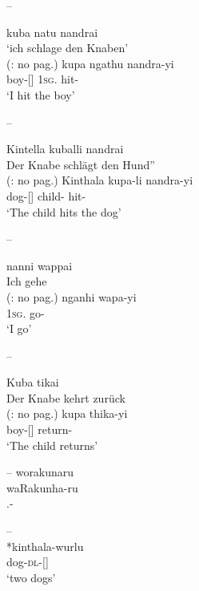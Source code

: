 \documentclass{langscibook}
\begin{document}
\begin{xlist}
\begin{xlist}
\begin{xlist}
--
\ea\label{bkm:Ref329630469}
\begin{xlist}
	\ex kuba natu nandrai \\
	\glt `ich schlage den Knaben'\\
	(\citealt{koch_untitled_1868}: no pag.)
	\ex
	\gll kupa              ngathu     nandra-yi\\
	boy-[]  1\textsc{sg}.   hit-\\
	\glt `I hit the boy'
\end{xlist}
\z
--
\ea\label{bkm:Ref329630485}
\begin{xlist}
	\ex Kintella kuballi nandrai \\
	\glt Der Knabe schlägt den Hund” \\
	(\citealt{koch_untitled_1868}: no pag.)
	\ex
	\gll Kinthala       kupa-li    nandra-yi\\
	dog-[]   child-    hit-\\
	\glt `The child hits the dog'
\end{xlist}
\z
--
\ea\label{bkm:Ref329630508}
\begin{xlist}
	\ex nanni wappai \\
	\glt Ich gehe \\
	(\citealt{koch_untitled_1868}: no pag.)
	\ex
	\gll nganhi wapa-yi\\
	1\textsc{sg}. go-\\
	\glt `I go'
\end{xlist}
\z
--
\ea\label{bkm:Ref329630522}
\begin{xlist}
	\ex Kuba tikai \\
	\glt Der Knabe kehrt zurück \\
	(\citealt{koch_untitled_1868}: no pag.)
	\ex
	\gll kupa thika-yi\\
	boy-[] return-\\
	\glt `The child returns'
\end{xlist}
\z
--
\ea
worakunaru\\
\gll waRakunha-ru\\
.-\\
\z


--
\ea
{} \\
*kinthala-wurlu \\
dog-\textsc{dl}-[]\\
\glt ‘two dogs’
\z






\end{xlist}
\end{xlist}
\end{xlist}
\end{document}
